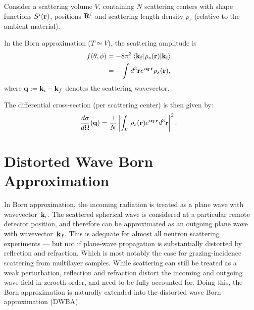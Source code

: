 Consider a scattering volume $V$, containing $N$ scattering centers with shape functions $S^i(\mathbf{r})$, positions $\mathbf{R}^i$ and scattering length density $\rho_s$ (relative to the ambient material).

In the Born approximation ($T\simeq V$), the scattering amplitude is
\begin{align*}
  f(\theta, \phi) & = -8\pi^3 \left\langle \mathbf{k_f} \vert \rho_s(\mathbf{r}) \vert \mathbf{k_i} \right\rangle \nonumber \\
  & = -\int d^3\mathbf{r} e^{i\mathbf{q}\cdot\mathbf{r}} \rho_s(\mathbf{r}),
\end{align*}
where $\mathbf{q}:=\mathbf{k}_i-\mathbf{k}_f$ denotes the scattering wavevector.

The differential cross-section (per scattering center) is then given by:
\begin{equation}\label{eq:xsec1}
  \frac{d\sigma}{d\Omega}(\mathbf{q}) = \frac{1}{N}\left\lvert \int_V \rho_s(\mathbf{r}) e^{i\mathbf{q}\cdot\mathbf{r}} d^3\mathbf{r} \right\rvert ^2.
\end{equation}



\section{Distorted Wave Born Approximation} 

In Born approximation,
the incoming radiation is treated as a plane wave
with wavevector~$\mathbf{k}_i$.
The scattered spherical wave is considered
at a particular remote detector position,
and therefore can be approximated as an outgoing plane wave
with wavevector~$\mathbf{k}_f$.
This is adequate for almost all neutron scattering experiments ---
but not if plane-wave propagation is substantially distorted
by reflection and refraction.
Which is most notably the case
for grazing-incidence scattering from multilayer samples.
While scattering can still be treated as a weak perturbation,
reflection and refraction distort the incoming and outgoing wave field
in zeroeth order,
and need to be fully accounted for.
Doing this, the Born approximation is naturally extended into
the distorted wave Born approximation (DWBA).


